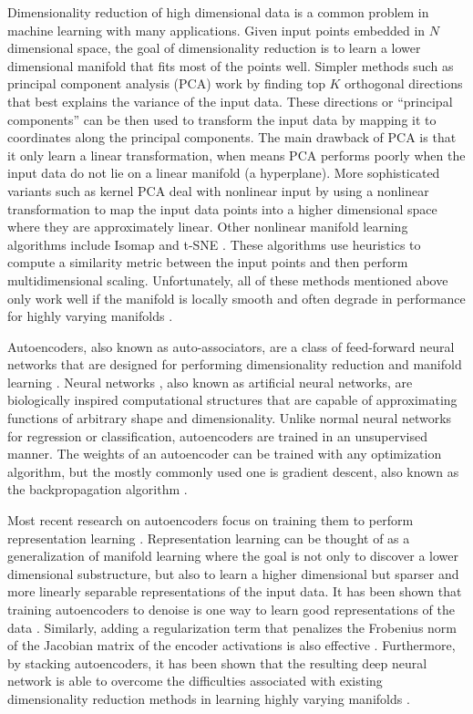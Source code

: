 Dimensionality reduction of high dimensional data is a common problem in machine learning with many applications. Given input points embedded in $N$ dimensional space, the goal of dimensionality reduction is to learn a lower dimensional manifold that fits most of the points well. Simpler methods such as principal component analysis (PCA) \cite{wold1987principal} work by finding top $K$ orthogonal directions that best explains the variance of the input data. These directions or ``principal components'' can be then used to transform the input data by mapping it to coordinates along the principal components. The main drawback of PCA is that it only learn a linear transformation, when means PCA performs poorly when the input data do not lie on a linear manifold (a hyperplane). More sophisticated variants such as kernel PCA \cite{scholkopf1997kernel} deal with nonlinear input by using a nonlinear transformation to map the input data points into a higher dimensional space where they are approximately linear. Other nonlinear manifold learning algorithms include Isomap \cite{tenenbaum2000global} and t-SNE \cite{van2008visualizing}. These algorithms use heuristics to compute a similarity metric between the input points and then perform multidimensional scaling. Unfortunately, all of these methods mentioned above only work well if the manifold is locally smooth and often degrade in performance for highly varying manifolds \cite{van2008visualizing}.

Autoencoders, also known as auto-associators, are a class of feed-forward neural networks that are designed for performing dimensionality reduction and manifold learning \cite{hinton2006reducing}. Neural networks \cite{haykin2004comprehensive}, also known as artificial neural networks, are biologically inspired computational structures that are capable of approximating functions of arbitrary shape and dimensionality. Unlike normal neural networks for regression or classification, autoencoders are trained in an unsupervised manner. The weights of an autoencoder can be trained with any optimization algorithm, but the mostly commonly used one is gradient descent, also known as the backpropagation algorithm \cite{hecht1989theory,bottou-91c}. 

Most recent research on autoencoders focus on training them to perform representation learning \cite{bengio2012rep}. Representation learning can be thought of as a generalization of manifold learning where the goal is not only to discover a lower dimensional substructure, but also to learn a higher dimensional but sparser and more linearly separable representations of the input data. It has been shown that training autoencoders to denoise is one way to learn good representations of the data \cite{vincent2010stacked}. Similarly, adding a regularization term that penalizes the Frobenius norm of the Jacobian matrix of the encoder activations is also effective \cite{rifai2011contractive}. Furthermore, by stacking autoencoders, it has been shown that the resulting deep neural network is able to overcome the difficulties associated with existing dimensionality reduction methods in learning highly varying manifolds \cite{van2008visualizing,vincent2010stacked}.

